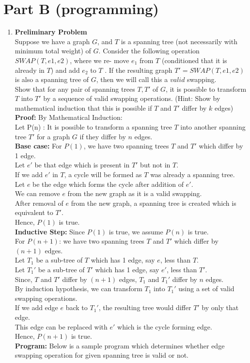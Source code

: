 \documentclass[12pt]{article}
\begin{document}
\section{Part B (programming)}
\begin{enumerate}
\item \textbf{Preliminary Problem}\\
Suppose we have a graph $G$, and $T$ is a spanning tree (not necessarily with minimum total weight) of $G$. Consider the following operation $SWAP(T,e1,e2)$, where we re- move $e_1$ from $T$ (conditioned that it is already in $T$) and add $e_2$ to $T$ . If the resulting graph $T' = SWAP(T,e1,e2)$ is also a spanning tree of $G$, then we will call this a $valid$ swapping.\\
Show that for any pair of spanning trees $T,T'$ of $G$, it is possible to transform $T$ into $T'$ by a sequence of valid swapping operations. (Hint: Show by mathematical induction that this is possible if $T$ and $T'$ differ by $k$ edges)\\
\textbf{Proof:} By Mathematical Induction:\\
Let P(n) : It is possible to transform a spanning tree $T$ into another spanning tree $T'$ for a graph $G$ if they differ by $n$ edges.\\
\textbf{Base case:} For $P(1)$, we have two spanning trees $T$ and $T'$ which differ by 1 edge.\\
Let $e'$ be that edge which is present in $T'$ but not in $T$.\\
If we add $e'$ in $T$,  a cycle will be formed as $T$ was already a spanning tree.\\
Let $e$ be the edge which forms the cycle after addition of $e'$.\\
We can remove $e$ from the new graph as it is a valid swapping.\\
After removal of $e$ from the new graph, a spanning tree is created which is equivalent to $T'$.\\
Hence, $P(1)$ is true.\\
\textbf{Inductive Step:} Since $P(1)$ is true, we assume $P(n)$ is true.\\
For $P(n+1)$:  we have two spanning trees $T$ and $T'$ which differ by $(n+1)$ edges.\\
Let $T_1$ be a sub-tree of $T$ which has 1 edge, say $e$, less than $T$.\\
Let $T_1'$ be a sub-tree of $T'$ which has 1 edge, say $e'$, less than $T'$.\\
Since, $T$ and $T'$ differ by $(n+1)$ edges, $T_1$ and $T_1'$ differ by $n$ edges.\\
By induction hypothesis, we can transform $T_1$ into $T_1'$ using a set of valid swapping operations.\\
If we add edge $e$ back to $T_1'$, the resulting tree would differ $T'$ by only that edge.\\
This edge can be replaced with $e'$ which is the cycle forming edge.\\
Hence, $P(n+1)$ is true.\\
\textbf{Program:} Below is a sample program which determines whether edge swapping operation for given spanning tree is valid or not.


\end{enumerate}
\end{document}
